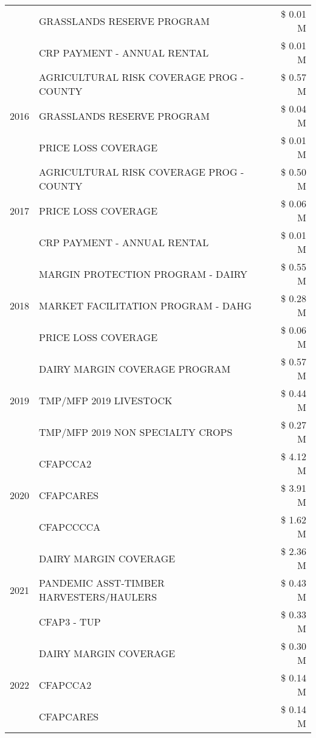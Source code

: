 \begin{tabular}{llr}
 & GRASSLANDS RESERVE PROGRAM & \$ 0.01 M \\
 & CRP PAYMENT - ANNUAL RENTAL & \$ 0.01 M \\
\cline{1-3}
\multirow[t]{3}{*}{2016} & AGRICULTURAL RISK COVERAGE PROG - COUNTY & \$ 0.57 M \\
 & GRASSLANDS RESERVE PROGRAM & \$ 0.04 M \\
 & PRICE LOSS COVERAGE & \$ 0.01 M \\
\cline{1-3}
\multirow[t]{3}{*}{2017} & AGRICULTURAL RISK COVERAGE PROG - COUNTY & \$ 0.50 M \\
 & PRICE LOSS COVERAGE & \$ 0.06 M \\
 & CRP PAYMENT - ANNUAL RENTAL & \$ 0.01 M \\
\cline{1-3}
\multirow[t]{3}{*}{2018} & MARGIN PROTECTION PROGRAM - DAIRY & \$ 0.55 M \\
 & MARKET FACILITATION PROGRAM - DAHG & \$ 0.28 M \\
 & PRICE LOSS COVERAGE & \$ 0.06 M \\
\cline{1-3}
\multirow[t]{3}{*}{2019} & DAIRY MARGIN COVERAGE PROGRAM & \$ 0.57 M \\
 & TMP/MFP 2019 LIVESTOCK & \$ 0.44 M \\
 & TMP/MFP 2019 NON SPECIALTY CROPS & \$ 0.27 M \\
\cline{1-3}
\multirow[t]{3}{*}{2020} & CFAPCCA2 & \$ 4.12 M \\
 & CFAPCARES & \$ 3.91 M \\
 & CFAPCCCCA & \$ 1.62 M \\
\cline{1-3}
\multirow[t]{3}{*}{2021} & DAIRY MARGIN COVERAGE & \$ 2.36 M \\
 & PANDEMIC ASST-TIMBER HARVESTERS/HAULERS & \$ 0.43 M \\
 & CFAP3 - TUP & \$ 0.33 M \\
\cline{1-3}
\multirow[t]{3}{*}{2022} & DAIRY MARGIN COVERAGE & \$ 0.30 M \\
 & CFAPCCA2 & \$ 0.14 M \\
 & CFAPCARES & \$ 0.14 M \\
\cline{1-3}
\bottomrule
\end{tabular}
